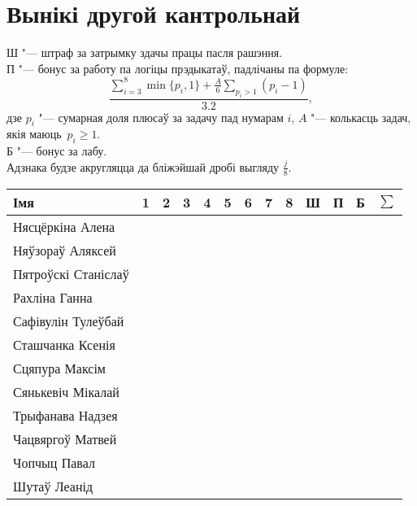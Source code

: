 


    \section{Вынікі другой кантрольнай}
    \noindent Ш "--- штраф за затрымку здачы працы пасля рашэння. \\
    П "--- бонус за работу па логіцы прэдыкатаў, падлічаны па формуле:
    $$\dfrac{\sum \limits _{i=3} ^8 \min\{p_i, 1\} + \frac{A}{6} \sum \limits _{p_i > 1} (p_i - 1)}{3.2},$$
    дзе $p_i$ "--- сумарная доля плюсаў за задачу пад нумарам $i$, $A$ "--- колькасць задач, якія маюць~$p_i \geqslant 1$. \\
    Б "--- бонус за лабу. \\
    Адзнака будзе акругляцца да бліжэйшай дробі выгляду $\frac{j}{8}$.
\begin{table}[H]
	\begin{tabular}{|l|c|c|c|c|c|c|c|c|c|c|c|c|}
		\hline
		Імя                 & 1 & 2   &  3   &  4   &  5   & 6 &  7  &  8   &  Ш   &   П   &  Б   & $\sum$ \\ \hline
		Нясцёркіна Алена    &  &    &     &     &     &  &    &     &     &      &  &    \\ \hline
		Няўзораў Аляксей    &  &    &     &     &     &  &    &     &     &      &     &       \\ \hline
		Пятроўскі Станіслаў &  &    &     &     &     &  &    &     &     &      &     &       \\ \hline
		Рахліна Ганна       &  &    &     &     &     &  &  &     &     &   &  &       \\ \hline
		Сафівулін Тулеўбай  &  &    &     &     &     &  &    &     &     &      &     &       \\ \hline
		Сташчанка Ксенія    &  &  &  &     &     &  &    &     &     &   &     &     \\ \hline
		Сцяпура Максім      &  &    &     &     &  &  &    &  &     &  &     &       \\ \hline
		Сянькевіч Мікалай   &  &    &     &     &     &  &    &     &     &      &     &       \\ \hline
		Трыфанава Надзея    &  &    &     &   &     &  &    &   &     &    &     &     \\ \hline
		Чацвяргоў Матвей    &  &    &     &     &     &  &    &     &  &      &     &    \\ \hline
		Чопчыц Павал        &  &    &     &     &     &  &    &     &     &  &     &       \\ \hline
		Шутаў Леанід        &  &    &     &  &     &  &    &     &     &      &     &    \\ \hline
	\end{tabular}
\end{table}


